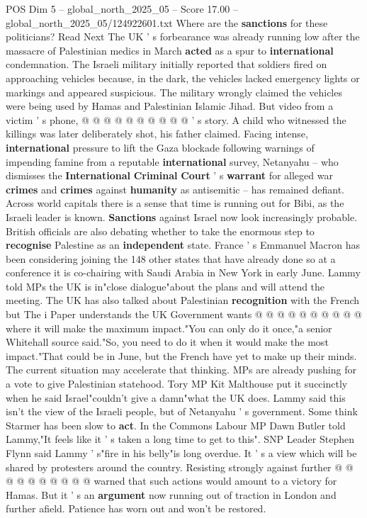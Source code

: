 \begin{textsample}{POS Dim 5 – global\_north\_2025\_05 – Score 17.00 – global\_north\_2025\_05/124922601.txt}
Where are the \textbf{sanctions} for these politicians?
Read Next The UK ' s forbearance was already running low after the massacre of Palestinian medics in March \textbf{acted} as a spur to \textbf{international} condemnation.
The Israeli military initially reported that soldiers fired on approaching vehicles because, in the dark, the vehicles lacked emergency lights or markings and appeared suspicious.
The military wrongly claimed the vehicles were being used by Hamas and Palestinian Islamic Jihad.
But video from a victim ' s phone, @ @ @ @ @ @ @ @ @ @ ' s story.
A child who witnessed the killings was later deliberately shot, his father claimed.
Facing intense, \textbf{international} pressure to lift the Gaza blockade following warnings of impending famine from a reputable \textbf{international} survey, Netanyahu -- who dismisses the \textbf{International} \textbf{Criminal} \textbf{Court} ' s \textbf{warrant} for alleged war \textbf{crimes} and \textbf{crimes} against \textbf{humanity} as antisemitic -- has remained defiant.
Across world capitals there is a sense that time is running out for Bibi, as the Israeli leader is known. \textbf{Sanctions} against Israel now look increasingly probable.
British officials are also debating whether to take the enormous step to \textbf{recognise} Palestine as an \textbf{independent} state.
France ' s Emmanuel Macron has been considering joining the 148 other states that have already done so at a conference it is co-chairing with Saudi Arabia in New York in early June.
Lammy told MPs the UK is in"close dialogue"about the plans and will attend the meeting.
The UK has also talked about Palestinian \textbf{recognition} with the French but The i Paper understands the UK Government wants @ @ @ @ @ @ @ @ @ @ where it will make the maximum impact."You can only do it once,"a senior Whitehall source said."So, you need to do it when it would make the most impact."That could be in June, but the French have yet to make up their minds.
The current situation may accelerate that thinking.
MPs are already pushing for a vote to give Palestinian statehood.
Tory MP Kit Malthouse put it succinctly when he said Israel"couldn't give a damn"what the UK does.
Lammy said this isn't the view of the Israeli people, but of Netanyahu ' s government.
Some think Starmer has been slow to \textbf{act}.
In the Commons Labour MP Dawn Butler told Lammy,"It feels like it ' s taken a long time to get to this".
SNP Leader Stephen Flynn said Lammy ' s"fire in his belly"is long overdue.
It ' s a view which will be shared by protesters around the country.
Resisting strongly against further @ @ @ @ @ @ @ @ @ @ warned that such actions would amount to a victory for Hamas.
But it ' s an \textbf{argument} now running out of traction in London and further afield.
Patience has worn out and won't be restored.

\end{textsample}
